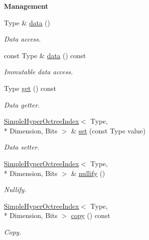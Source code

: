 \begin{Indent}{\bf Management}\par
\begin{DoxyCompactItemize}
\item 
Type \& \hyperlink{exceptionmagrathea_1_1SimpleHyperOctreeIndex_a0f07dc45b0c087dcf209cf4ef0a3ab1c}{data} ()
\begin{DoxyCompactList}\small\item\em Data access. \end{DoxyCompactList}\item 
const Type \& \hyperlink{exceptionmagrathea_1_1SimpleHyperOctreeIndex_a6ec036259d3a272436e0643b36d6214c}{data} () const 
\begin{DoxyCompactList}\small\item\em Immutable data access. \end{DoxyCompactList}\item 
Type \hyperlink{exceptionmagrathea_1_1SimpleHyperOctreeIndex_ace325c08e417dadd2e53c324ff6c6b49}{get} () const 
\begin{DoxyCompactList}\small\item\em Data getter. \end{DoxyCompactList}\item 
\hyperlink{exceptionmagrathea_1_1SimpleHyperOctreeIndex}{Simple\-Hyper\-Octree\-Index}$<$ Type, \\*
Dimension, Bits $>$ \& \hyperlink{exceptionmagrathea_1_1SimpleHyperOctreeIndex_a4f9c372446a3c9fc6bab2c758bda9d97}{set} (const Type value)
\begin{DoxyCompactList}\small\item\em Data setter. \end{DoxyCompactList}\item 
\hyperlink{exceptionmagrathea_1_1SimpleHyperOctreeIndex}{Simple\-Hyper\-Octree\-Index}$<$ Type, \\*
Dimension, Bits $>$ \& \hyperlink{exceptionmagrathea_1_1SimpleHyperOctreeIndex_a0b965da38f454aa415e524f5ca70ff34}{nullify} ()
\begin{DoxyCompactList}\small\item\em Nullify. \end{DoxyCompactList}\item 
\hyperlink{exceptionmagrathea_1_1SimpleHyperOctreeIndex}{Simple\-Hyper\-Octree\-Index}$<$ Type, \\*
Dimension, Bits $>$ \hyperlink{exceptionmagrathea_1_1SimpleHyperOctreeIndex_a6fcde37be45cc88f40f0f87592afb204}{copy} () const 
\begin{DoxyCompactList}\small\item\em Copy. \end{DoxyCompactList}\item 

\end{DoxyCompactItemize}
\end{Indent}
